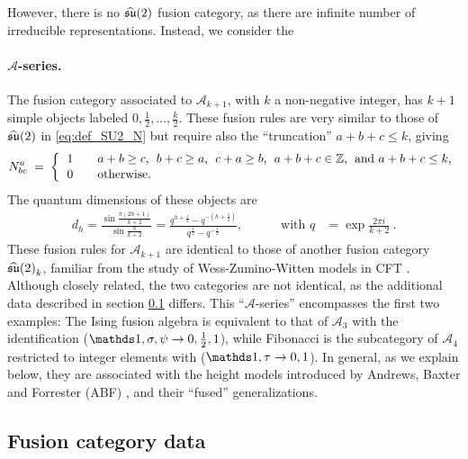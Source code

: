 However, there is no ${\widehat{\mathfrak{su}}(2)}$ fusion category, as there are infinite number of irreducible representations. Instead, we consider the

\paragraph{$\mathcal{A}$-series.}
The fusion category associated to $\mathcal{A}_{k+1}$, with $k$ a non-negative integer, has $k+1$ simple objects labeled $0,\frac12,\dots,\frac{k}{2}$.  
These fusion rules are very similar to those of ${\widehat{\mathfrak{su}}(2)}$ in \eqref{eq:def_SU2_N} but require also the ``truncation'' $a+b+c \leq k$, giving
\begin{align}
	N^a_{bc} \;=\; \bigg\{ \begin{tabular}{l @{\qquad} l}
		1	&	$a+b \geq c$,\; $b+c \geq a$,\; $c+a \geq b$,\; $a+b+c \in \mathbb{Z}$,\; and $a+b+c \leq k$,
	\\[0.2ex]	0	&	otherwise.
	\end{tabular}
	\label{eq:def_Ak_N}
\end{align}
The quantum dimensions of these objects are
\begin{align}
	d_h = \frac{ \sin\frac{\pi(2h+1)}{k+2} }{ \sin\frac{\pi}{k+2} } = \frac{q^{h+\frac12} - q^{-(h+\frac12)}}{q^{\frac12}-q^{-\frac12}} ,\qquad\quad
		\textrm{with } q & = \exp\frac{2\pi i}{k+2}\ .
	\label{eq:def_QD}
\end{align}
These fusion rules for $\mathcal{A}_{k+1}$ are identical to those of another fusion category ${\widehat{\mathfrak{su}}(2)}_k$, familiar from the study of Wess-Zumino-Witten models in CFT \cite{KZ}. Although closely related, the two categories are not identical, as the additional data described in section \ref{sec:category} differs. 
This  ``$\mathcal{A}$-series'' encompasses the first two examples:
The Ising fusion algebra is equivalent to that of $\mathcal{A}_{3}$ with the identification  ($\I,\sigma,\psi \rightarrow 0,\frac12,1$), while Fibonacci is the subcategory of $\mathcal{A}_4$ restricted to integer elements with ($  \I,\tau\rightarrow 0, 1$).
In general, as we explain below, they are associated with the height models introduced by Andrews, Baxter and Forrester (ABF) \cite{Andrews1984}, and their ``fused'' generalizations.



\subsection{Fusion category data}
\label{sec:category} 

